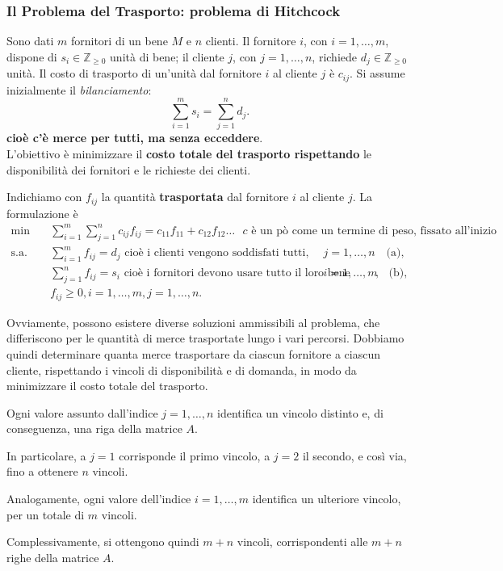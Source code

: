 \subsubsection{Il Problema del Trasporto: problema di Hitchcock}
\label{ex:trasporto}
Sono dati \(m\) fornitori di un bene \(M\) e \(n\) clienti.
Il fornitore \(i\), con \(i=1,\ldots,m\), dispone di
\(s_i\in\mathbb Z_{\geq0}\) unità di bene; il cliente \(j\),
con \(j=1,\ldots,n\), richiede \(d_j\in\mathbb Z_{\geq0}\) unità.
Il costo di trasporto di un'unità dal fornitore \(i\) al cliente \(j\)
è \(c_{ij}\). Si assume inizialmente il \emph{bilanciamento}:
\begin{equation}
\sum_{i=1}^m s_i=\sum_{j=1}^n d_j.
\tag{3.1}\label{eq:bilanciamento}
\end{equation}
\textbf{cioè c'è merce per tutti, ma senza ecceddere}.\\

L'obiettivo è minimizzare il \textbf{costo totale del trasporto rispettando}
le disponibilità dei fornitori e le richieste dei clienti.

Indichiamo con \(f_{ij}\) la quantità \textbf{trasportata} dal fornitore \(i\) al cliente \(j\).
La formulazione è
\begin{align*}
\min\quad &\sum_{i=1}^m\sum_{j=1}^n c_{ij}f_{ij} = c_{11} f_{11} + c_{12} f_{12} \dots \text{ $c$ è un pò come un termine di peso, fissato all'inizio}\\
\text{s.a.}\quad
&\sum_{i=1}^m f_{ij}=d_j \text{ cioè i clienti vengono soddisfati tutti},
&&j=1,\ldots,n \quad \text{(a)},\\
&\sum_{j=1}^n f_{ij}=s_i \text{ cioè i fornitori devono usare tutto il loro bene disponibile e darlo ai clienti},
&&i=1,\ldots,m \quad \text{(b)},\\
&f_{ij}\geq0,
i=1,\ldots,m,j=1,\ldots,n.
\end{align*}


\begin{warning}{}
    Ovviamente, possono esistere diverse soluzioni ammissibili al problema, che differiscono per le quantità di merce trasportate lungo i vari percorsi. Dobbiamo quindi determinare quanta merce trasportare da ciascun fornitore a ciascun cliente, rispettando i vincoli di disponibilità e di domanda, in modo da minimizzare il costo totale del trasporto.
\end{warning}
\begin{observation}{}
    Ogni valore assunto dall'indice $j=1,\dots,n$ identifica un vincolo distinto e, di conseguenza, una riga della matrice $A$.

    In particolare, a $j=1$ corrisponde il primo vincolo, a $j=2$ il secondo, e così via, fino a ottenere $n$ vincoli.

    Analogamente, ogni valore dell'indice $i=1,\dots,m$ identifica un ulteriore vincolo, per un totale di $m$ vincoli.

    Complessivamente, si ottengono quindi $m+n$ vincoli, corrispondenti alle $m+n$ righe della matrice $A$.
\end{observation}

